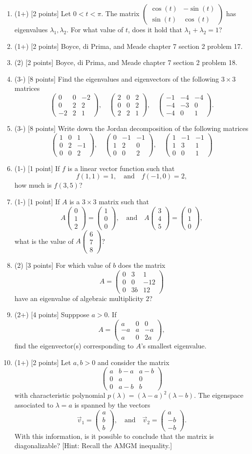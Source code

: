 \documentclass[12pt]{article}
\newcommand{\twobytwo}[4]{\begin{pmatrix} %
   #1 & #2 \\ #3 & #4 \end{pmatrix}}
\newcommand{\threebyone}[3]{\begin{pmatrix} %
   #1 \\ #2 \\ #3 \end{pmatrix}}
\newcommand{\threebythree}[9]{\begin{pmatrix} %
   #1 & #2 & #3 \\ #4 & #5 & #6 \\ #7 & #8 & #9 \end{pmatrix}}
\begin{document}
\begin{enumerate}
\item (1+) [2 points] Let \(0<t<\pi\). The matrix \(\twobytwo{\cos(t)}{-\sin(t)}{\sin(t)}{\cos(t)}\) has eigenvalues \(\lambda_1,\lambda_2\). For what value of \(t\), does it hold that \(\lambda_1+\lambda_2=1\)?

\item (1+) [2 points] Boyce, di Prima, and Meade chapter 7 section 2 problem 17.
  
\item (2) [2 points] Boyce, di Prima, and Meade chapter 7 section 2 problem 18.

\item (3-) [8 points] Find the eigenvalues and eigenvectors of the following \(3\times 3\) matrices
\[
\threebythree{0}{0}{-2}{0}{2}{2}{-2}{2}{1},\quad\threebythree{2}{0}{2}{0}{0}{2}{2}{2}{1},\quad\threebythree{-1}{-4}{-4}{-4}{-3}{0}{-4}{0}{1}.
\]

\item (3-) [8 points] Write down the Jordan decomposition of the following matrices
\[
\threebythree{1}{0}{1}{0}{2}{-1}{0}{0}{2},\quad\threebythree{0}{-1}{-1}{1}{2}{0}{0}{0}{2},\quad\threebythree{1}{-1}{-1}{1}{3}{1}{0}{0}{1}
\]
\item (1-) [1 point] If \(f\) is a linear vector function such that 
\[f(1,1)=1,\quad\text{and}\quad f(-1,0)=2,\]
how much is \(f(3,5)\)?

\item (1-) [1 point] If \(A\) is a \(3\times 3\) matrix such that 
\[
A\threebyone{0}{1}{2}=\threebyone{1}{0}{0},\quad\text{and}\quad A\threebyone{3}{4}{5}=\threebyone{0}{1}{0},
\]
what is the value of \(A\threebyone{6}{7}{8}\)?

\item (2) [3 points] For which value of \(b\) does the matrix
\[A=\threebythree{0}{3}{1}{0}{0}{-12}{0}{3b}{12}\]
have an eigenvalue of algebraic multiplicity \(2\)?

\item (2+) [4 points] Supppose \(a>0\). If 
\[A=\threebythree{a}{0}{0}{-a}{a}{-a}{a}{0}{2a},\]
find the eigenvector(s) corresponding to \(A\)'s smallest eigenvalue.

\item (1+) [2 points] Let \(a,b>0\) and consider the matrix
\[
\threebythree{a}{b-a}{a-b}{0}{a}{0}{0}{a-b}{b}
\]
with characteristic polynomial \(p(\lambda)=(\lambda-a)^2(\lambda-b)\). The eigenspace associated to \(\lambda=a\) is spanned by the vectors 
\[\vec{v}_1=\threebyone{a}{b}{b},\quad\text{and}\quad\vec{v}_2=\threebyone{a}{-b}{-b}.\]
With this information, is it possible to conclude that the matrix is diagonalizable? [Hint: Recall the AMGM inequality.]
\end{enumerate}
\end{document}
